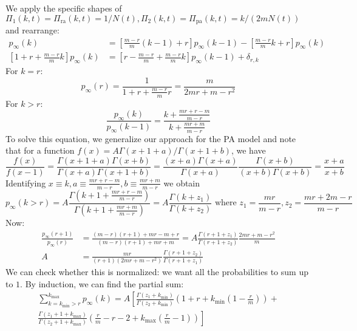 \documentclass[a4paper,12pt]{article}
\begin{document}
We apply the specific shapes of $\Pi_1(k,t)=\Pi_{\mathrm{ra}}(k,t)=1/N(t),\Pi_2(k,t)=\Pi_{\mathrm{pa}}(k,t)=k/(2mN(t))$ and rearrange:
\begin{align*}
p_\infty(k)&=\left[\frac{m-r}{m}(k-1)+r\right]p_\infty(k-1)-\left[\frac{m-r}{m}k+r\right]p_\infty(k)\\
\left[1+r+\frac{m-r}{m}k\right]p_\infty(k)&= \left[r-\frac{m-r}{m}+\frac{m-r}{m}k\right]p_\infty(k-1)+\delta_{r,k}
\end{align*}
For $k=r$:
\begin{equation*}
p_\infty(r)=\frac{1}{1+r+\frac{m-r}{m}r}=\frac{m}{2mr+m-r^2}
\end{equation*}
For $k>r$:
\begin{equation*}
\frac{p_\infty(k)}{p_\infty(k-1)}=\frac{k+\frac{mr+r-m}{m-r}}{k+\frac{mr+m}{m-r}}
\end{equation*}
To solve this equation, we generalize our approach for the PA model and note that for a function $f(x)=A\Gamma(x+1+a)/\Gamma(x+1+b)$, we have
$$\frac{f(x)}{f(x-1)}=\frac{\Gamma(x+1+a)\Gamma(x+b)}{\Gamma(x+a)\Gamma(x+1+b)}=\frac{(x+a)\Gamma(x+a)}{\Gamma(x+a)}\frac{\Gamma(x+b)}{(x+b)\Gamma(x+b)}=\frac{x+a}{x+b}$$
Identifying $x\equiv k, a\equiv \frac{mr+r-m}{m-r}, b\equiv \frac{mr+m}{m-r}$ we obtain
\begin{equation*}
p_\infty(k>r)=A\frac{\Gamma(k+1+\frac{mr+r-m}{m-r})}{\Gamma(k+1+\frac{mr+m}{m-r})}=A\frac{\Gamma(k+z_1)}{\Gamma(k+z_2)}\mbox{ where }z_1=\frac{mr}{m-r},z_2=\frac{mr+2m-r}{m-r}
\end{equation*}
Now:
\begin{align*}
\frac{p_\infty(r+1)}{p_\infty(r)}&= \frac{(m-r)(r+1)+mr-m+r}{(m-r)(r+1)+mr+m} = A\frac{\Gamma(r+1+z_1)}{\Gamma(r+1+z_2)}\frac{2mr+m-r^2}{m}\\
A&= \frac{mr}{(r+1)(2mr+m-r^2)}\frac{\Gamma(r+1+z_2)}{\Gamma(r+1+z_1)}
\end{align*}
We can check whether this is normalized: we want all the probabilities to sum up to $1$. By induction, we can find the partial sum:
\begin{multline} \label{RAPApartial}
\sum_{k=k_{\mathrm{min}}>r}^{k_{\mathrm{max}}}p_\infty(k)=A\left[\frac{\Gamma(z_1+k_{\mathrm{min}})}{\Gamma(z_2+k_{\mathrm{min}})}\left(1+r+k_{\mathrm{min}}\left(1-\frac{r}{m}\right)\right)+\right.\\
\left.\frac{\Gamma(z_1+1+k_{\mathrm{max}})}{\Gamma(z_2+1+k_{\mathrm{max}})}\left(\frac{r}{m}-r-2+k_{\mathrm{max}}\left(\frac{r}{m}-1\right)\right)\right]
\end{multline}
\end{document}
